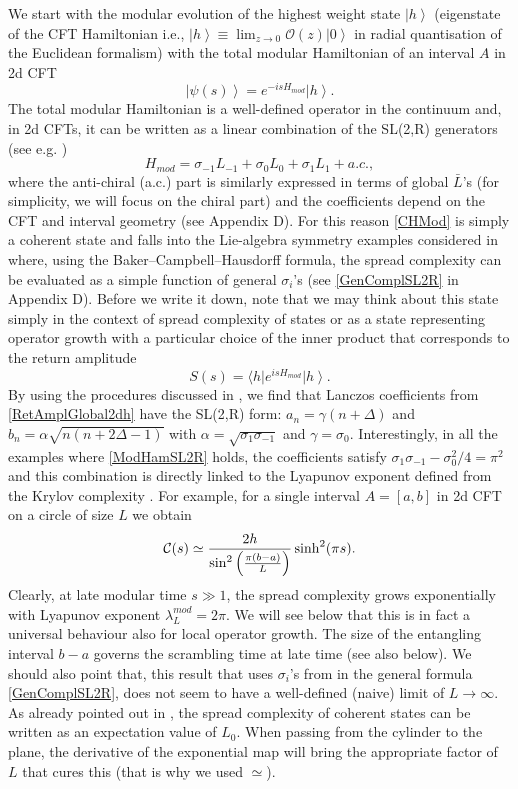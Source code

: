 \documentclass[aps,prl,twocolumn,showpacs,preprintnumbers,amsmath,amssymb]{revtex4-1}
\def\frac#1#2{{#1\over #2}}
\def\be{\begin{equation}}
\def\ee{\end{equation}}
\newcommand{\ket}[1]{\left| #1 \right>}
\begin{document}
We start with the modular evolution of the highest weight state $\ket{h}$ (eigenstate of the CFT Hamiltonian i.e., $\ket{h}\equiv \lim_{z\to 0}\mathcal{O}(z)\ket{0}$ in radial quantisation of the Euclidean formalism) with the total modular Hamiltonian of an interval $A$ in 2d CFT 
\be
\ket{\psi(s)}=e^{-isH_{mod}}\ket{h}.\label{CHMod}
\ee
The total modular Hamiltonian is a well-defined operator in the continuum and, in 2d CFTs, it can be written as a linear combination of the  SL(2,R) generators (see e.g. \cite{Kabat:2017mun,Czech:2019vih})
\be
H_{mod}=\sigma_{-1}L_{-1}+\sigma_0 L_0+\sigma_1 L_1+a.c.,\label{ModHamSL2R}
\ee 
where the anti-chiral (a.c.) part is similarly expressed in terms of global $\bar{L}$'s (for simplicity, we will focus on the chiral part) and the coefficients depend on the CFT  and interval geometry (see Appendix D). For this reason \eqref{CHMod} is simply a coherent state and falls into the Lie-algebra symmetry examples considered in \cite{Caputa:2021sib,Balasubramanian:2022tpr} where, using the Baker–Campbell–Hausdorff formula, the spread complexity can be evaluated as a simple function of general $\sigma_i$'s (see \eqref{GenComplSL2R} in Appendix D). Before we write it down, note that we may think about this state simply in the context of spread complexity of states \cite{Balasubramanian:2022tpr} or as a state representing operator growth \cite{Parker:2018yvk} with a particular choice of the inner product that corresponds to the return amplitude
\be
S(s)=\langle h|e^{isH_{mod}}\ket{h}.\label{RetAmplGlobal2dh}
\ee
By using the procedures discussed in \cite{Caputa:2021sib,Balasubramanian:2022tpr}, we find that Lanczos coefficients from \eqref{RetAmplGlobal2dh} have the SL(2,R) form: $a_n=\gamma(n+\Delta)$ and $b_n=\alpha\sqrt{n(n+2\Delta-1)}$  with $\alpha=\sqrt{\sigma_1\sigma_{-1}}$ and $\gamma=\sigma_0$. Interestingly, in all the examples where \eqref{ModHamSL2R} holds, the coefficients satisfy $\sigma_1\sigma_{-1}-\sigma^2_0/4=\pi^2$ and this combination is directly linked to the Lyapunov exponent defined from the Krylov complexity \cite{Parker:2018yvk}. For example, for a single interval $A=[a,b]$ in 2d CFT on a circle of size $L$ we obtain
\be
\mathcal{C}(s)\simeq\frac{2h}{\sin^2\left(\frac{\pi(b-a)}{L}\right)}\sinh^2(\pi s).\label{ComPlGlobCH}
\ee
Clearly, at late modular time $s\gg 1$, the spread complexity grows exponentially with Lyapunov exponent $\lambda^{mod}_L=2\pi$. We will see below that this is in fact a universal behaviour also for local operator growth. The size of the entangling interval $b-a$ governs the scrambling time at late time (see also below). We should also point that, this result that uses $\sigma_i$'s from  \cite{Kabat:2017mun,Czech:2019vih} in the general formula \eqref{GenComplSL2R}, does not seem to have a well-defined (naive) limit of $L\to\infty$. As already pointed out in \cite{Caputa:2021sib,Caputa:2021ori}, the spread complexity of coherent states can be written as an expectation value of $L_0$. When passing from the cylinder to the plane, the derivative of the exponential map will bring the appropriate factor of $L$ that cures this (that is why we used $\simeq$).
\end{document}
